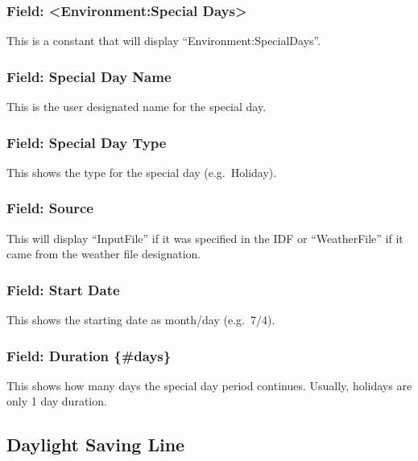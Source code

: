 \subsubsection{Field: \textless{}Environment:Special Days\textgreater{}}\label{field-environmentspecial-days}

This is a constant that will display ``Environment:SpecialDays''.

\subsubsection{Field: Special Day Name}\label{field-special-day-name}

This is the user designated name for the special day.

\subsubsection{Field: Special Day Type}\label{field-special-day-type}

This shows the type for the special day (e.g.~Holiday).

\subsubsection{Field: Source}\label{field-source}

This will display ``InputFile'' if it was specified in the IDF or ``WeatherFile'' if it came from the weather file designation.

\subsubsection{Field: Start Date}\label{field-start-date-1}

This shows the starting date as month/day (e.g.~7/4).

\subsubsection{Field: Duration \{\#days\}}\label{field-duration-days-1}

This shows how many days the special day period continues. Usually, holidays are only 1 day duration.

\subsection{Daylight Saving Line}\label{daylight-saving-line}

